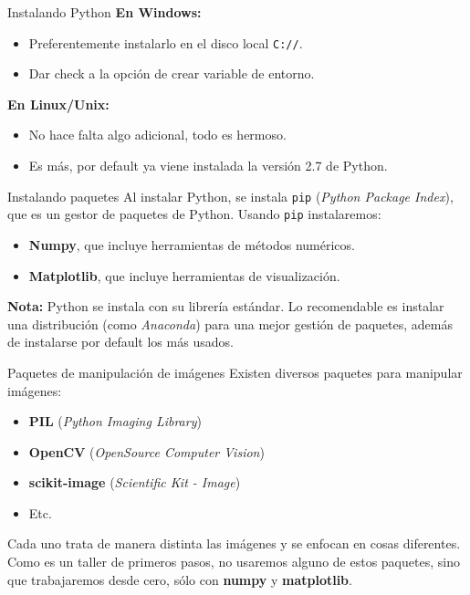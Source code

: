 \documentclass[usenames,dvipsnames]{beamer}
\begin{document}
  \begin{frame}{Instalando Python}
    \textbf{En Windows:}
    \begin{itemize}
      \item Preferentemente instalarlo en el disco local \texttt{C://}.
      \item Dar check a la opción de crear variable de entorno.
    \end{itemize}
    \textbf{En Linux/Unix:}
    \begin{itemize}
      \item No hace falta algo adicional, todo es hermoso.
      \item Es más, por default ya viene instalada la versión 2.7 de Python.
    \end{itemize}
  \end{frame}

  \begin{frame}{Instalando paquetes}
    Al instalar Python, se instala \texttt{pip} (\textit{Python Package Index}),
    que es un gestor de paquetes de Python. Usando \texttt{pip} instalaremos:
    \begin{itemize}
      \item \textbf{Numpy}, que incluye herramientas de métodos numéricos.
      \item \textbf{Matplotlib}, que incluye herramientas de visualización.
    \end{itemize}
    \textbf{Nota:} Python se instala con su librería estándar. Lo recomendable
    es instalar una distribución (como \textit{Anaconda}) para una mejor
    gestión de paquetes, además de instalarse por default los más usados.
  \end{frame}

  \begin{frame}{Paquetes de manipulación de imágenes}
    Existen diversos paquetes para manipular imágenes:
    \begin{itemize}
      \item \textbf{PIL} (\textit{Python Imaging Library})
      \item \textbf{OpenCV} (\textit{OpenSource Computer Vision})
      \item \textbf{scikit-image} (\textit{Scientific Kit - Image})
      \item Etc.
    \end{itemize}
    Cada uno trata de manera distinta las imágenes y se enfocan en cosas
    diferentes. Como es un taller de primeros pasos, no usaremos alguno de
    estos paquetes, sino que trabajaremos desde cero, sólo con \textbf{numpy}
    y \textbf{matplotlib}.
  \end{frame}
\end{document}
